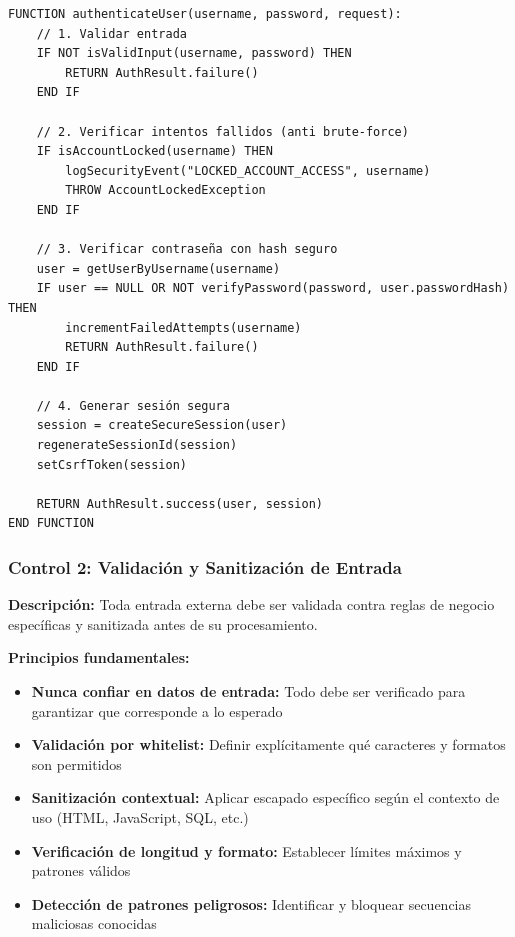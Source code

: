 {\begin{lstlisting}[language=pseudocode, caption=Pseudocódigo para autenticación segura]
FUNCTION authenticateUser(username, password, request):
    // 1. Validar entrada
    IF NOT isValidInput(username, password) THEN
        RETURN AuthResult.failure()
    END IF
    
    // 2. Verificar intentos fallidos (anti brute-force)
    IF isAccountLocked(username) THEN
        logSecurityEvent("LOCKED_ACCOUNT_ACCESS", username)
        THROW AccountLockedException
    END IF
    
    // 3. Verificar contraseña con hash seguro
    user = getUserByUsername(username)
    IF user == NULL OR NOT verifyPassword(password, user.passwordHash) THEN
        incrementFailedAttempts(username)
        RETURN AuthResult.failure()
    END IF
    
    // 4. Generar sesión segura
    session = createSecureSession(user)
    regenerateSessionId(session)
    setCsrfToken(session)
    
    RETURN AuthResult.success(user, session)
END FUNCTION
\end{lstlisting}

\subsubsection{Control 2: Validación y Sanitización de Entrada}

\textbf{Descripción:} Toda entrada externa debe ser validada contra reglas de negocio específicas y sanitizada antes de su procesamiento.

\textbf{Principios fundamentales:}
\begin{itemize}
    \item \textbf{Nunca confiar en datos de entrada:} Todo debe ser verificado para garantizar que corresponde a lo esperado
    \item \textbf{Validación por whitelist:} Definir explícitamente qué caracteres y formatos son permitidos
    \item \textbf{Sanitización contextual:} Aplicar escapado específico según el contexto de uso (HTML, JavaScript, SQL, etc.)
    \item \textbf{Verificación de longitud y formato:} Establecer límites máximos y patrones válidos
    \item \textbf{Detección de patrones peligrosos:} Identificar y bloquear secuencias maliciosas conocidas
\end{itemize}

}
